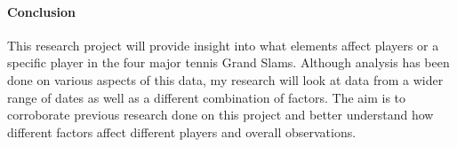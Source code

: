 \documentclass[12pt]{article}
\begin{document}
\paragraph{Conclusion}
This research project will provide insight into what elements affect players 
or a specific player in the four major tennis Grand Slams. Although analysis 
has been done on various aspects of this data, my research will look at data 
from a wider range of dates as well as a different combination of factors. 
The aim is to corroborate previous research done on this project and better 
understand how different factors affect different players and overall 
observations. 



\end{document}
